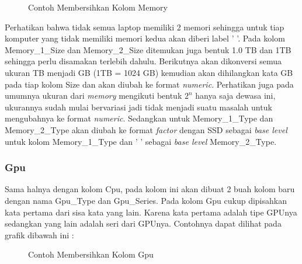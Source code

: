 \documentclass[12pt]{article}
\begin{document}
\begin{figure}[h!]
    \centering
    \caption{Contoh Membersihkan Kolom Memory}
    \label{clean_memory}
\end{figure}
Perhatikan bahwa tidak semua laptop memiliki 2 memori sehingga untuk tiap komputer yang tidak memiliki memori kedua akan diberi label ' '. Pada kolom Memory\_1\_Size dan Memory\_2\_Size ditemukan juga bentuk 1.0 TB dan 1TB sehingga perlu disamakan terlebih dahulu. Berikutnya akan dikonversi semua ukuran TB menjadi GB (1TB = 1024 GB) kemudian akan dihilangkan kata GB pada tiap kolom Size dan akan diubah ke format \textit{numeric}.  Perhatikan juga pada umumnya ukuran dari \textit{memory} mengikuti bentuk $2^n$ hanya saja dewasa ini, ukurannya sudah mulai bervariasi jadi tidak menjadi suatu masalah untuk mengubahnya ke format \textit{numeric}. Sedangkan untuk  Memory\_1\_Type dan Memory\_2\_Type akan diubah ke format \textit{factor} dengan SSD sebagai \textit{base level} untuk kolom Memory\_1\_Type dan ' ' sebagai \textit{base level} Memory\_2\_Type.
\subsubsection{Gpu}
Sama halnya dengan kolom Cpu, pada kolom ini akan dibuat 2 buah kolom baru dengan nama Gpu\_Type dan Gpu\_Series. Pada kolom Gpu cukup dipisahkan kata pertama dari sisa kata yang lain. Karena kata pertama adalah tipe GPUnya sedangkan yang lain adalah seri dari GPUnya. Contohnya dapat dilihat pada grafik dibawah ini :  
  
\begin{figure}[h!]
    \centering
    \caption{Contoh Membersihkan Kolom Gpu}
    \label{clean_cpu}
\end{figure}  
  
\end{document}
